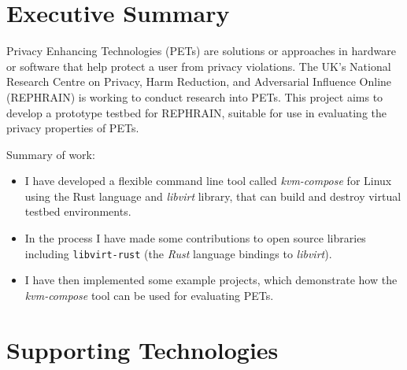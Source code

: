 \documentclass[
    author={Jacob Daniel Halsey},
    supervisor={Prof. Awais Rashid},
    degree={BSc},
    title={Building a Testbed for Evaluating Privacy Enhancing Technologies  (PETs)},
    subtitle={},
    type={software development},
    year={2021}
]{dissertation}
\begin{document}
\maketitle
\frontmatter
\makedecl
\tableofcontents

\chapter*{Executive Summary}

Privacy Enhancing Technologies (PETs) are solutions or approaches in hardware or
software that help protect a user from privacy violations. 
The UK's National Research Centre on Privacy, Harm Reduction, and Adversarial Influence Online (REPHRAIN)
is working to conduct research into PETs.
This project aims to develop a prototype testbed for REPHRAIN, 
suitable for use in evaluating the privacy properties of PETs.

\vspace{1cm}

Summary of work:

\begin{itemize}
\item I have developed a flexible command line tool called \emph{kvm-compose} for Linux using the Rust
      language and \emph{libvirt} library, that can build and destroy virtual testbed environments.
\item In the process I have made some contributions to open source libraries including \texttt{libvirt-rust}
(the \emph{Rust} language bindings to \emph{libvirt}).
\item I have then implemented some example projects, which demonstrate how the \emph{kvm-compose} tool
can be used for evaluating PETs.
\end{itemize}

\chapter*{Supporting Technologies}
\label{chap:supporting_tech}
\end{document}
